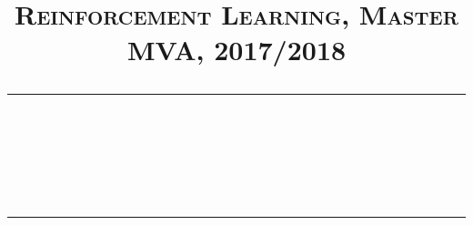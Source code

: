 \newcommand{\assignmenttitle}{}
\newcommand{\studentname}{}
\newcommand{\email}{}
\newcommand{\schoolyear}{2017/2018}


\title{
\normalfont \normalsize 
\textsc{Reinforcement Learning, Master MVA, \schoolyear} \\
[10pt] 
\rule{\linewidth}{0.5pt} \\[6pt] 
\huge \assignmenttitle \\
\rule{\linewidth}{2pt}  \\[10pt]
}

\author{\studentname}

\date{\small\email}

\newcommand{\question}[1]{\subsubsection*{#1}}


\graphicspath{{images/}}

\newcommand{\labelnotempty}[1]{
\def\temp{#1}\ifx\temp\empty
\else
    \label{#1}
\fi
}
\newcommand{\singlefig}[4]{
\begin{figure}[ht!]
        \centering
        \texttt{[image: \#1]}
        \caption{#3}
        \labelnotempty{#4}
\end{figure}}

\newcommand{\subfig}[4]{
\texttt{[image: \#1]}
\caption{#3}
\labelnotempty{#4}
}

\newcommand{\doublefig}[4]{
\begin{figure}[ht!]
    \centering
    \begin{subfigure}[t]{0.45\columnwidth}
        \centering
    #1
    \end{subfigure}
    ~
    \begin{subfigure}[t]{0.45\columnwidth}
        \centering
    #2
    \end{subfigure}
    \caption{#3}
    \labelnotempty{#4}
\end{figure}}

\newcommand{\triplefig}[5]{
\begin{figure}[ht!]
    \centering
    \begin{subfigure}[t]{0.30\columnwidth}
        \centering
    #1
    \end{subfigure}
    ~
    \begin{subfigure}[t]{0.30\columnwidth}
        \centering
    #2
    \end{subfigure}
    ~
    \begin{subfigure}[t]{0.30\columnwidth}
        \centering
    #3
    \end{subfigure}
    \caption{#4}
    \labelnotempty{#5}
\end{figure}}

